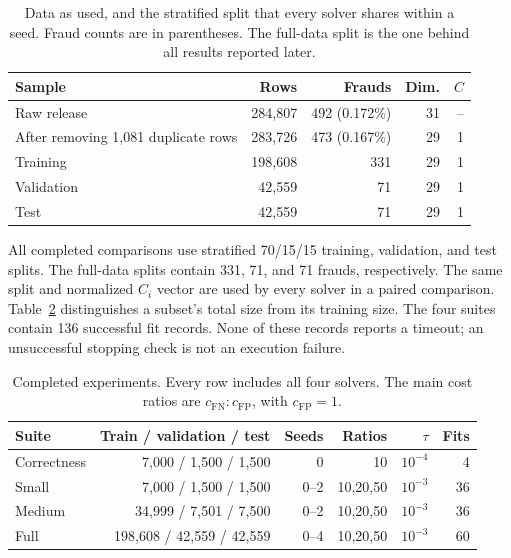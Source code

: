 \documentclass{article}
\newcommand{\FNcost}{c_{\mathrm{FN}}}
\newcommand{\FPcost}{c_{\mathrm{FP}}}
\begin{document}
\begin{table}[htbp]
\caption{Data as used, and the stratified split that every solver shares within a seed. Fraud counts are in parentheses. The full-data split is the one behind all results reported later.}
\label{tab:data}
\centering\small\setlength{\tabcolsep}{5pt}
\begin{tabular}{@{}lrrrr@{}}
\toprule
Sample & Rows & Frauds & Dim. & $C$\\
\midrule
Raw release & 284,807 & 492 (0.172\%) & 31 & --\\
After removing 1,081 duplicate rows & 283,726 & 473 (0.167\%) & 29 & 1\\
\midrule
Training & 198,608 & 331 & 29 & 1\\
Validation & 42,559 & 71 & 29 & 1\\
Test & 42,559 & 71 & 29 & 1\\
\bottomrule
\end{tabular}
\end{table}


All completed comparisons use stratified 70/15/15 training, validation, and test splits. The full-data splits contain 331, 71, and 71 frauds, respectively. The same split and normalized $C_i$ vector are used by every solver in a paired comparison. Table~\ref{tab:matrix} distinguishes a subset's total size from its training size. The four suites contain 136 successful fit records. None of these records reports a timeout; an unsuccessful stopping check is not an execution failure.

\begin{table}[htbp]
\caption{Completed experiments. Every row includes all four solvers. The main cost ratios are $\FNcost:\FPcost$, with $\FPcost=1$.}
\label{tab:matrix}
\centering\small
\setlength{\tabcolsep}{4pt}
\begin{tabular}{@{}lrrrrr@{}}
\toprule
Suite & Train / validation / test & Seeds & Ratios & $\tau$ & Fits\\
\midrule
Correctness & 7,000 / 1,500 / 1,500 & 0 & 10 & $10^{-4}$ & 4\\
Small & 7,000 / 1,500 / 1,500 & 0--2 & 10,20,50 & $10^{-3}$ & 36\\
Medium & 34,999 / 7,501 / 7,500 & 0--2 & 10,20,50 & $10^{-3}$ & 36\\
Full & 198,608 / 42,559 / 42,559 & 0--4 & 10,20,50 & $10^{-3}$ & 60\\
\bottomrule
\end{tabular}
\end{table}
\end{document}
